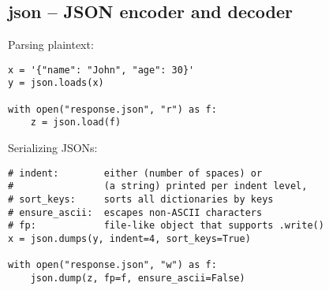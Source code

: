 %

\subsection{json -- JSON encoder and decoder}
Parsing plaintext:
\begin{verbatim}
x = '{"name": "John", "age": 30}'
y = json.loads(x)

with open("response.json", "r") as f:
    z = json.load(f)
\end{verbatim}

Serializing JSONs:
\begin{verbatim}
# indent:        either (number of spaces) or 
#                (a string) printed per indent level, 
# sort_keys:     sorts all dictionaries by keys
# ensure_ascii:  escapes non-ASCII characters
# fp:            file-like object that supports .write()
x = json.dumps(y, indent=4, sort_keys=True)

with open("response.json", "w") as f:
    json.dump(z, fp=f, ensure_ascii=False)
\end{verbatim}

%